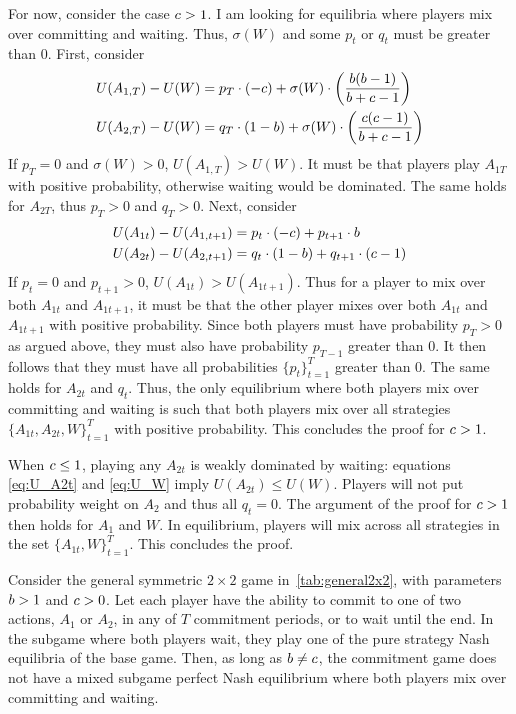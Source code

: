 \documentclass[main.tex]{subfiles}
\begin{document}
For now, consider the case $c > 1$.
I am looking for equilibria where players mix over committing and waiting. Thus, $\sigma(W)$ and some $p_t$ or $q_t$ must be greater than 0.
First, consider
\begin{align*}
U(A_{1, T}) - U(W) &= p_{T} \cdot (- c) + \sigma(W) \cdot \left( \frac{b(b-1)}{b+c-1} \right) \\
U(A_{2, T}) - U(W) &= q_{T} \cdot (1-b) + \sigma(W) \cdot \left( \frac{c(c-1)}{b+c-1} \right)
\end{align*}
If $p_{T}=0$ and $\sigma(W)>0$, $U(A_{1,T})>U(W)$. It must be that players play $A_{1T}$ with positive probability, otherwise waiting would be dominated. The same holds for $A_{2T}$, thus $p_T>0$ and $q_T>0$.
Next, consider
\begin{align*}
    U(A_{1t})-U(A_{1,t+1}) &= p_t \cdot (-c) + p_{t+1} \cdot b \\
    U(A_{2t})-U(A_{2,t+1}) &=  q_t \cdot (1-b) + q_{t+1} \cdot (c-1)
\end{align*}
If $p_t=0$ and $p_{t+1}>0$, $U(A_{1t})>U(A_{1t+1})$. Thus for a player to mix over both $A_{1t}$ and $A_{1t+1}$, it must be that the other player mixes over both $A_{1t}$ and $A_{1t+1}$ with positive probability. Since both players must have probability $p_T>0$ as argued above, they must also have probability $p_{T-1}$ greater than 0. It then follows that they must have all probabilities $\{p_t\}_{t=1}^T$ greater than 0. The same holds for $A_{2t}$ and $q_t$.
Thus, the only equilibrium where both players mix over committing and waiting is such that both players mix over all strategies $\{A_{1t}, A_{2t}, W\}_{t=1}^{T}$ with positive probability. This concludes the proof for $c>1$.

When $c\leq1$, playing any $A_{2t}$ is weakly dominated by waiting: equations \ref{eq:U_A2t} and \ref{eq:U_W} imply $U(A_{2t})\leq U(W)$. 
Players will not put probability weight on $A_2$ and thus all $q_t=0$. The argument of the proof for $c>1$ then holds for $A_1$ and $W$. In equilibrium, players will mix across all strategies in the set $\{A_{1t}, W\}_{t=1}^{T}$. This concludes the proof.

\begin{lemma}\label{lem:no-msne-with-pure-strats}
    Consider the general symmetric $2\times2$ game in~\autoref{tab:general2x2}, with parameters $b > 1$ and $c > 0$. 
    Let each player have the ability to commit to one of two actions, $A_1$ or $A_2$, in any of $T$ commitment periods, or to wait until the end. 
    In the subgame where both players wait, they play one of the pure strategy Nash equilibria of the base game.
    Then, as long as $b\neq c$, the commitment game does not have a mixed subgame perfect Nash equilibrium where both players mix over committing and waiting.
\end{lemma}
\end{document}
